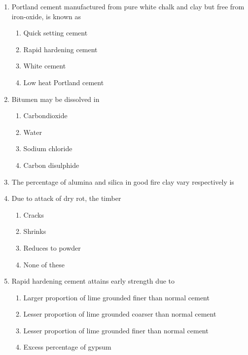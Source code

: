 \documentclass[11pt,a4paper]{article}
\begin{document}
\begin{enumerate}
\item{Portland cement manufactured from pure white chalk and clay but free from iron-oxide, is known as}
\begin{enumerate}[label=\Alph*.]
\item{Quick setting cement}
\item{Rapid hardening cement}
\item{White cement}
\item{Low heat Portland cement}
\end{enumerate}
\item{Bitumen may be dissolved in}
\begin{enumerate}[label=\Alph*.]
\item{Carbondioxide}
\item{Water}
\item{Sodium chloride}
\item{Carbon disulphide}
\end{enumerate}
\item{The percentage of alumina and silica in good fire clay vary respectively is}
\\
\item{Due to attack of dry rot, the timber}
\begin{enumerate}[label=\Alph*.]
\item{Cracks}
\item{Shrinks}
\item{Reduces to powder}
\item{None of these}
\end{enumerate}
\item{Rapid hardening cement attains early strength due to}
\begin{enumerate}[label=\Alph*.]
\item{Larger proportion of lime grounded finer than normal cement}
\item{Lesser proportion of lime grounded coarser than normal cement}
\item{Lesser proportion of lime grounded finer than normal cement}
\item{Excess percentage of gypsum}
\end{enumerate}

\end{enumerate}
\end{document}
